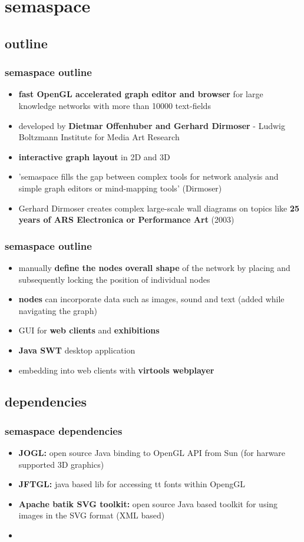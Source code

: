 \documentclass[blue]{beamer}
\begin{document}
\section{semaspace}
\subsection{outline}
\frame
{
\frametitle{\textbf{semaspace outline}}
\begin{itemize}
	\item \textbf{fast OpenGL accelerated graph editor and browser} for large knowledge networks with more than 10000 text-fields
	\item developed by \textbf{Dietmar Offenhuber and Gerhard Dirmoser} - Ludwig Boltzmann Institute for Media Art Research
	\item \textbf{interactive graph layout} in 2D and 3D
	\item 'semaspace fills the gap between complex tools for network analysis and simple graph editors or mind-mapping tools' (Dirmoser)
	\item Gerhard Dirmoser creates complex large-scale wall diagrams on topics like \textbf{25 years of ARS Electronica or Performance Art} (2003)
\end{itemize}
}

\frame
{
\frametitle{\textbf{semaspace outline}}
\begin{itemize}
	\item manually \textbf{define the nodes overall shape} of the network by placing and subsequently locking the position of individual nodes
	\item \textbf{nodes} can incorporate data such as images, sound and text (added while navigating the graph)
	\item GUI for \textbf{web clients} and \textbf{exhibitions}
	\item \textbf{Java SWT} desktop application
	\item embedding into web clients with \textbf{virtools webplayer}
\end{itemize}
}

\subsection{dependencies}
\frame
{
\frametitle{\textbf{semaspace dependencies}}
\begin{itemize}
	\item \textbf{JOGL:} open source Java binding to OpenGL API from Sun (for harware supported 3D graphics)
	\item \textbf{JFTGL:} java based lib for accessing tt fonts within OpengGL
	\item \textbf{Apache batik SVG toolkit:} open source Java based toolkit for using images in the SVG format (XML based)
	\item \textbf{}
\end{itemize}
}
\end{document}
